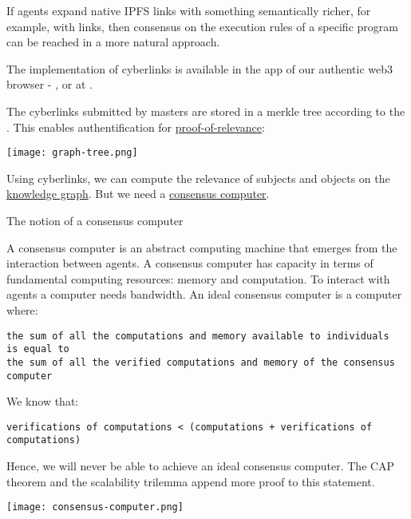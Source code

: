 \documentclass[8pt,oneside]{amsart}
\makeatletter
\newcommand{\linkred}[2]{\href{#1}{\color{red}{#2}}}
\newcommand{\linkgreen}[2]{\href{#1}{\color{green}{#2}}}
\renewcommand\subsection{\@startsection{subsection}
                                    {2}{\z@}
                                    {-3.25ex\@plus -1ex \@minus -.2ex}
                                    {0ex \@plus .2ex}
                                    {\play\Large}
                        }
\newcommand{\titleSection}[1]{\subsection{#1}}
\newenvironment{Figure}
  {\par\medskip\noindent\minipage{\linewidth}}
  {\endminipage\par\medskip}
\makeatother
\begin{document}
If agents expand native IPFS links with something semantically richer, for example, with
\linkred{https://github.com/cybercongress/cyb/blob/dev/docs/dura.md}{dura}
links, then consensus on the execution rules of a specific program can be reached in a more natural approach. 

The \linkred{https://github.com/cybercongress/go-cyber}{сyberd} implementation of cyberlinks is available in the \linkred{https://github.com/cybercongress/dot-cyber}{.cyber} app of our authentic web3 browser - \linkred{https://cyb.ai}{cyb}, or at \linkred{http://cyber.page}{cyber.page}.

The cyberlinks submitted by masters are stored in a merkle tree according to the \linkgreen{https://ipfs.io/ipfs/QmZpJLmc3T2L1FLUxzvU3P8MBCPe15fEmUyVS7Bz8ZKMhG}{RFC-6962 standard}. This enables authentification for {\hyperref[proof-of-relevance]{proof-of-relevance}}:

\begin{Figure}
    \centering
    \texttt{[image: graph-tree.png]}
\end{Figure}

Using cyberlinks, we can compute the relevance of subjects and objects on the {\hyperref[knowledge-graph]{knowledge graph}}. But we need a {\hyperref[consensus-computer]{consensus computer}}.

\titleSection{The notion of a consensus computer}\label{consensus-computer}

A consensus computer is an abstract computing machine that emerges from the interaction between agents. A consensus computer has capacity in terms of fundamental computing resources: memory and computation. To interact with agents a computer needs bandwidth. An ideal consensus computer is a computer where:
\\
\begin{lstlisting}
the sum of all the computations and memory available to individuals
is equal to
the sum of all the verified computations and memory of the consensus computer
\end{lstlisting}

We know that:
\begin{lstlisting}
verifications of computations < (computations + verifications of computations)
\end{lstlisting}

Hence, we will never be able to achieve an ideal consensus computer. The CAP theorem and the scalability trilemma append more proof to this statement.
\begin{Figure}
    \centering
    \texttt{[image: consensus-computer.png]}
\end{Figure}
\end{document}
